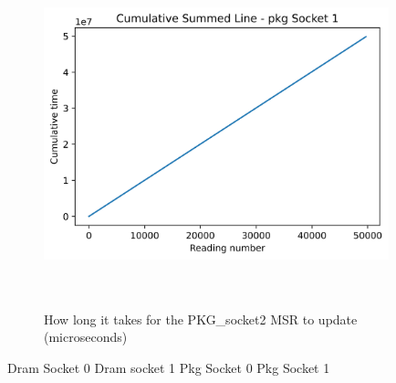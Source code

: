 \begin{figure}[H]
    \centering
    \includegraphics[width=10cm,height=10cm,keepaspectratio]{jmh/msr-update-rate/pkg_Socket_1-cumulative-summed.png}
    \caption{How long it takes for the PKG\_socket2 MSR to update (microseconds)}
    \label{fig:PKG-rapl-counter}
\end{figure}

Dram Socket 0
%
Dram socket 1
%
Pkg Socket 0
%
Pkg Socket 1
%